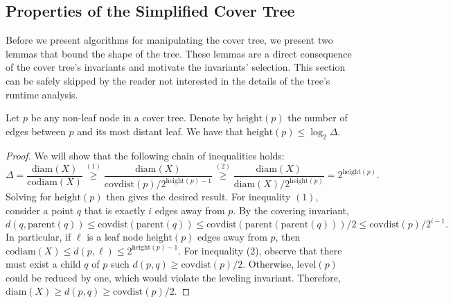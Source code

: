 \documentclass[../main.tex]{subfiles}
\newcommand{\dist}[2]{\distf({#1},{#2})}
\newcommand{\distf}{d}
\newcommand{\diam}[1]{\text{diam}({#1})}
\newcommand{\codiam}[1]{\text{codiam}({#1})}
\newcommand{\aspect}[1]{\Delta}
\newcommand{\mkfunction}[1]{\ensuremath{\text{{#1}}}}
\newcommand{\level}[1]      {\mkfunction{level}({#1})}
\newcommand{\parent}[1]     {\mkfunction{parent}({#1})}
\newcommand{\covdist}[1]    {\mkfunction{covdist}({#1})}
\newcommand{\maxdist}[1]    {\mkfunction{maxdist}({#1})}
\newcommand{\height}[1]     {\mkfunction{height}({#1})}
\begin{document}

\subsection{Properties of the Simplified Cover Tree}

Before we present algorithms for manipulating the cover tree, 
we present two lemmas that bound the shape of the tree.
These lemmas are a direct consequence of the cover tree's invariants and motivate the invariants' selection.
This section can be safely skipped by the reader not interested in the details of the tree's runtime analysis.


%


\begin{lemma}
    \label{lemma:height}
    Let $p$ be any non-leaf node in a cover tree.
    Denote by $\height{p}$ the number of edges between $p$ and its most distant leaf.
    We have that $\height{p} \le \log_2\aspect{X}$.
\end{lemma}

\begin{proof}
    We will show that the following chain of inequalities holds:
    \begin{equation}
        \aspect{X} 
        = \frac{\diam{X}}{\codiam{X}} 
        \overset{(1)}\ge \frac{\diam{X}}{\covdist{p}/2^{\height p-1}} 
        \overset{(2)}\ge \frac{\diam{X}}{\diam{X}/2^{\height p}} 
        = 2^{\height p}
        .
    \end{equation}
    Solving for $\height p$ then gives the desired result.
    For inequality $(1)$, consider a point $q$ that is exactly $i$ edges away from $p$.
    By the covering invariant, 
    \begin{equation}
        \dist{q}{\parent{q}} 
        \le 
        \covdist{\parent{q}}
        \le 
        \covdist{\parent{\parent{q}}}/2
        \le
        \covdist{p}/2^{i-1}
        .
    \end{equation}
    In particular, if $\ell$ is a leaf node $\height p$ edges away from $p$,
    then $\codiam{X}\le\dist{p}{\ell}\le2^{\height p-1}$.
    For inequality (2), observe that there must exist a child $q$ of $p$ such $\dist{p}{q} \ge \covdist{p}/2$.
    Otherwise, $\level p$ could be reduced by one, which would violate the leveling invariant.
    Therefore, $\diam{X} \ge \dist{p}{q} \ge \covdist{p}/2$.
\end{proof}
\end{document}
